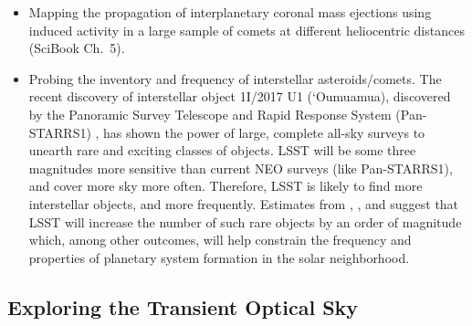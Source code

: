 \begin{itemize}
\item Mapping the propagation of interplanetary coronal mass ejections using induced
 activity in a large sample of comets at different heliocentric distances
(SciBook Ch.~5).
\item Probing the inventory and frequency of  interstellar asteroids/comets. The recent discovery of interstellar object
1I/2017 U1 (`Oumuamua), discovered by the Panoramic Survey Telescope and Rapid Response System (Pan-STARRS1) \citep{MPEC1}, has shown the power  of large, complete all-sky surveys to unearth
rare and exciting classes of objects. LSST will be some three magnitudes more sensitive
than  current NEO surveys (like Pan-STARRS1), and cover more sky more
often. Therefore, LSST is likely to find more interstellar objects, and more frequently.
Estimates from  \cite{Cook2016},  \cite{Engelhardt2017}, and \cite{Trilling2017} suggest that LSST will increase the number of  such rare objects by an order of magnitude which, among other outcomes, will help
constrain the frequency and properties of planetary system formation in the solar neighborhood.
\end{itemize}


\subsection{ Exploring the Transient Optical Sky }




